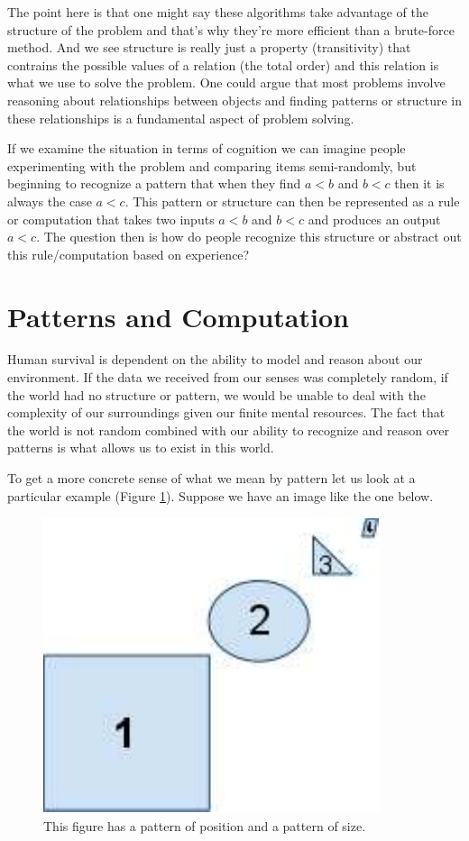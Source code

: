 \documentclass[a4paper,12pt]{article}
\begin{document}
The point here is that one might say these algorithms take advantage of the structure of the problem and that's why they're more efficient than a brute-force method.  And we see structure is really just a property (transitivity) that contrains the possible values of a relation (the total order) and this relation is what we use to solve the problem.  One could argue that most problems involve reasoning about relationships between objects and finding patterns or structure in these relationships is a fundamental aspect of problem solving.

If we examine the situation in terms of cognition we can imagine people experimenting with the problem and comparing items semi-randomly, but beginning to recognize a pattern that when they find $a<b$ and $b<c$ then it is always the case $a<c$.  This pattern or structure can then be represented as a rule or computation that takes two inputs $a<b$ and $b<c$ and produces an output $a<c$.  The question then is how do people recognize this structure or abstract out this rule/computation based on experience?

\section{Patterns and Computation}
  Human survival is dependent on the ability to model and reason about our environment.  If the data we received from our senses was completely random, if the world had no structure or pattern, we would be unable to deal with the complexity of our surroundings given our finite mental resources.  The fact that the world is not random combined with our ability to recognize and reason over patterns is what allows us to exist in this world.  

To get a more concrete sense of what we mean by pattern let us look at
a particular example (Figure \ref{fig:patterns}).  Suppose we have an image like the one below. 
\begin{figure}[htbp]
\begin{center}
\includegraphics[scale=.5]{patterns.pdf}
\caption{This figure has a pattern of position and a pattern of size. }
\label{fig:patterns}
\end{center}
\end{figure}
\end{document}
